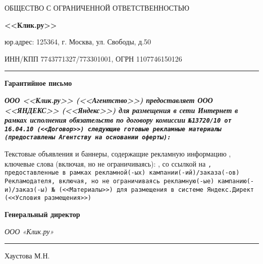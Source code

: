 





\begin{center}
\large{ОБЩЕСТВО С ОГРАНИЧЕННОЙ ОТВЕТСТВЕННОСТЬЮ}

\Huge{\textbf{<<Клик.ру>>}}
\end{center}

\begin{small}
юр.адрес:  125364, г. Москва, ул. Свободы, д.50

ИНН/КПП 7743771327/773301001, ОГРН 1107746150126
\end{small}

\vspace{0.5em}

\hrule height 1pt

\vspace{1em}

\begin{center}\textbf{Гарантийное письмо}\end{center}

\noindent
\bf\sl ООО <<Клик.ру>> \rm (<<Агентство>>) предоставляет
\bf\sl ООО <<ЯНДЕКС>> \rm (<<Яндекс>>) для размещения в сети
Интернет в рамках исполнения обязательств по договору
комиссии \tt №13720/10 \rm от \tt 16.04.10 \rm (<<Договор>>) следующие
готовые рекламные материалы (предоставлены Агентству на основании оферты):

\vspace{1em}

\noindent
\rm Текстовые объявления и баннеры, содержащие рекламную информацию \advtheme,
ключевые слова (включая, но не ограничиваясь):
\keywords, со ссылкой на \lb \tt \website\rm,
предоставленные в рамках рекламной(-ых) кампании(-ий)/заказа(-ов)
Рекламодателя, включая, но не ограничиваясь рекламную(-ые) кампанию(-и)/заказ(-ы) 
\tt №\ordernums \rm \ (<<Ма\-те\-риалы>>) для размещения в
системе Яндекс.Директ (<<Условия размещения>>)

\vspace{1em}



\vspace{3em}

\noindent
\bf Генеральный директор

\noindent
\sl ООО «Клик.ру» \hspace{5cm} \rule{5cm}{0.2mm}Хаустова М.Н.

\rm\bf



